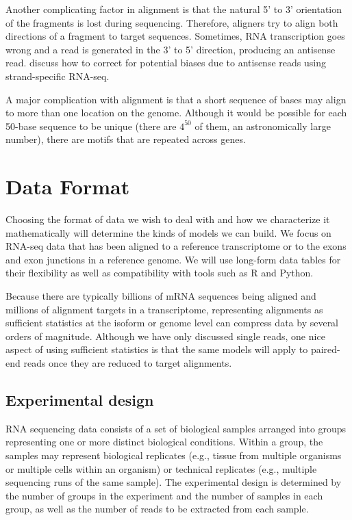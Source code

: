 \documentclass[11pt]{report}
\begin{document}
Another complicating factor in alignment is that the natural 5' to 3'
orientation of the fragments is lost during sequencing. Therefore,
aligners try to align both directions of a fragment to target
sequences. Sometimes, RNA transcription goes wrong and a read is
generated in the 3' to 5' direction, producing an antisense read.
\cite{mourao2019detection} discuss how to correct for potential biases
due to antisense reads using strand-specific RNA-seq.

A major complication with alignment is that a short sequence of bases
may align to more than one location on the genome. Although it would
be possible for each 50-base sequence to be unique (there are $4^{50}$
of them, an astronomically large number), there are motifs that are
repeated across genes.


\chapter{Data Format}

Choosing the format of data we wish to deal with and how we
characterize it mathematically will determine the kinds of models we
can build. We focus on RNA-seq data that has been aligned to a
reference transcriptome or to the exons and exon junctions in a
reference genome. We will use long-form data tables for their
flexibility as well as compatibility with tools such as R and Python.

Because there are typically billions of mRNA sequences being aligned
and millions of alignment targets in a transcriptome, representing
alignments as sufficient statistics at the isoform or genome level can
compress data by several orders of magnitude. Although we have only
discussed single reads, one nice aspect of using sufficient statistics
is that the same models will apply to paired-end reads once they are
reduced to target alignments.


\section{Experimental design}

RNA sequencing data consists of a set of biological samples arranged
into groups representing one or more distinct biological conditions.
Within a group, the samples may represent biological replicates (e.g.,
tissue from multiple organisms or multiple cells within an organism)
or technical replicates (e.g., multiple sequencing runs of the same
sample). The experimental design is determined by the number of groups
in the experiment and the number of samples in each group, as well as
the number of reads to be extracted from each sample.  
\end{document}
